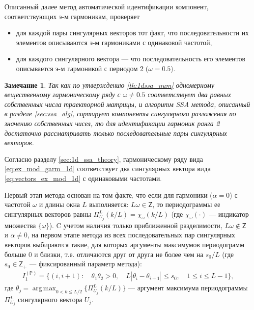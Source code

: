\documentclass[specialist,
               substylefile = spbu.rtx,
               subf,href,colorlinks=true, 12pt]{disser}
\def\argmax{\mathop{\mathrm{argmax}}}
\def\argmax{\mathop{\mathrm{arg\,max}}}
\newtheorem{remark}{Замечание}
\begin{document}
Описанный далее метод автоматической идентификации компонент, соответствующих э-м гармоникам, проверяет
\begin{itemize}
\item для каждой пары сингулярных векторов тот факт, что последовательности их элементов описываются э-м гармониками с одинаковой частотой,
\item для каждого сингулярного вектора --- что последовательность его элементов описывается э-м гармоникой с периодом 2 ($\omega=0.5$).
\end{itemize}

\begin{remark}
Так как по утверждению \ref{th:1dssa_num} одномерному вещественному гармоническому ряду с $\omega \not = 0.5$ соответствует два равных собственных числа траекторной матрицы, и алгоритм SSA метода, описанный в разделе \ref{sec:ssa_alg}, сортирует компоненты сингулярного разложения по значению собственных чисел, то
для идентификации гармоник ранга 2 достаточно рассматривать только последовательные пары сингулярных векторов.
\end{remark}

Согласно разделу \ref{sec:1d_ssa_theory}, гармоническому ряду вида \eqref{eq:ex_mod_garm_1d} соответствует два сингулярных вектора вида \eqref{eq:vectors_ex_mod_1d} с одинаковыми частотами.

Первый этап метода основан на том факте, что если для гармоники ($\alpha = 0$) с частотой $\omega$ и длины окна $L$ выполняется: $L \omega \in \mathsf{Z}$, то периодограммы ее сингулярных векторов равны $\Pi_{U_j}^L(k/L)=\chi_{\omega}(k/L)$ (где $\chi_{\omega}(\cdot)$ --- индикатор множества $\{\omega\}$).
C учетом наличия только приближенной разделимости, $L\omega \not \in \mathsf{Z}$ и $\alpha \not = 0$,
на первом этапе метода из всех последовательных пар сингулярных векторов выбираются такие, для которых аргументы максимумов периодограмм больше 0 и близки, т.е. отличаются друг от друга не более чем на $s_0/L$ (где $s_0 \in \mathsf{Z}_+$ --- фиксированный параметр метода):
\begin{gather} \label{eq:I_1_P}
I_1^{(\mathbb{P})} = \{ (i, i+1): \quad \theta_1 \theta_2 >0, \quad L |\theta_i - \theta_{i+1}| \leqslant s_0, \quad 1 \leqslant i \leqslant L -1  \},
\end{gather}
где $\theta_j = \argmax_{0 < k \leqslant L/2} \{\Pi_{U_j}^L(k/L)\}$ --- аргумент максимума периодограммы $\Pi_{U_j}^{L}$ сингулярного вектора $U_j$.
\end{document}
